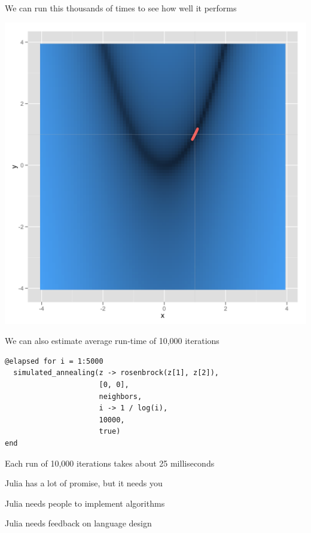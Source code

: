\documentclass{beamer}
\begin{document}
\frame
{
	\begin{center}
		We can run this thousands of times to see how well it performs
	\end{center}
}

\frame
{
	\begin{center}
		\includegraphics[scale = 0.1]{rosenbrock.png}
	\end{center}
}

\frame
{
	\begin{center}
		We can also estimate average run-time of 10,000 iterations
	\end{center}
}

\begin{frame}[fragile]
	\begin{verbatim}
@elapsed for i = 1:5000
  simulated_annealing(z -> rosenbrock(z[1], z[2]),
                      [0, 0],
                      neighbors,
                      i -> 1 / log(i),
                      10000,
                      true)
end
	\end{verbatim}
\end{frame}

\frame
{
	\begin{center}
		Each run of 10,000 iterations takes about 25 milliseconds
	\end{center}
}

\frame
{
	\begin{center}
		Julia has a lot of promise, but it needs you
	\end{center}
}

\frame
{
	\begin{center}
		Julia needs people to implement algorithms
	\end{center}
}

\frame
{
	\begin{center}
		Julia needs feedback on language design
	\end{center}
}
\end{document}
